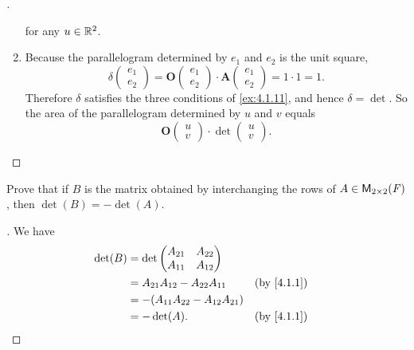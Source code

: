 \begin{proof}[]
\begin{enumerate}
\[		      \]
		      for any \(u \in \mathbb{R}^2\).
		\item Because the parallelogram determined by \(e_1\) and \(e_2\) is the unit square,
		      \[
			      \delta\begin{pmatrix}
				      e_1 \\
				      e_2
			      \end{pmatrix} = \mathbf{O}\begin{pmatrix}
				      e_1 \\
				      e_2
			      \end{pmatrix} \cdot \mathbf{A}\begin{pmatrix}
				      e_1 \\
				      e_2
			      \end{pmatrix} = 1 \cdot 1 = 1.
		      \]
		      Therefore \(\delta\) satisfies the three conditions of \cref{ex:4.1.11}, and hence \(\delta = \det\).
		      So the area of the parallelogram determined by \(u\) and \(v\) equals
		      \[
			      \mathbf{O}\begin{pmatrix}
				      u \\
				      v
			      \end{pmatrix} \cdot \det\begin{pmatrix}
				      u \\
				      v
			      \end{pmatrix}.
		      \]
	\end{enumerate}
\end{proof}

\exercisesection

\setcounter{ex}{4}
\begin{ex}\label{ex:4.1.5}
	Prove that if \(B\) is the matrix obtained by interchanging the rows of \(A \in \mathsf{M}_{{2} \times 2}({\mathit{F}})\), then \(\det(B) = -\det(A)\).
\end{ex}

\begin{proof}[]
	We have
	\begin{align*}
		\det(B) & = \det\begin{pmatrix}
			                A_{2 1} & A_{2 2} \\
			                A_{1 1} & A_{1 2}
		                \end{pmatrix}                                \\
		        & = A_{2 1} A_{1 2} - A_{2 2} A_{1 1}    &  & \by{4.1.1} \\
		        & = -(A_{1 1} A_{2 2} - A_{1 2} A_{2 1})                 \\
		        & = -\det(A).                            &  & \by{4.1.1}
	\end{align*}
\end{proof}

